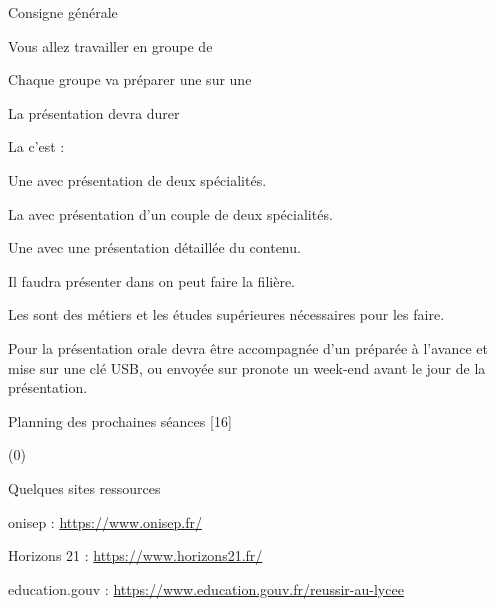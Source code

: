 \teteSndAP
{}

\begin{doc}{Consigne générale}
  \begin{listePoints}
    \item Vous allez travailler en groupe de 
    \item Chaque groupe va préparer une  sur une 
    \item La présentation devra durer 
    \item La  c'est :
    \begin{listePoints}
      \item Une  avec présentation de deux spécialités.
      \item La  avec présentation d'un couple de deux spécialités.
      \item Une  avec une présentation détaillée du contenu.
    \end{listePoints}
    \item Il faudra présenter dans  on peut faire la filière.
    \item Les  sont des métiers et les études supérieures nécessaires pour les faire.
  \end{listePoints}

  Pour la présentation orale devra être accompagnée d'un  préparée à l'avance et mise sur une clé USB, ou envoyée sur pronote un week-end avant le jour de la présentation.
\end{doc}

\begin{doc}{Planning des prochaines séances}
  [16]
  \vspace*{-218 pt}
  
  \begin{programmeSeance}[2]
  \end{programmeSeance}
  \begin{programmeSeance}[2](0)
  \end{programmeSeance}
\end{doc}

\begin{doc}{Quelques sites ressources}
  \begin{listePoints}
    \item onisep : \url{https://www.onisep.fr/}  
    \item Horizons 21 : \url{https://www.horizons21.fr/}
    \item education.gouv : \url{https://www.education.gouv.fr/reussir-au-lycee}
  \end{listePoints}
\end{doc}